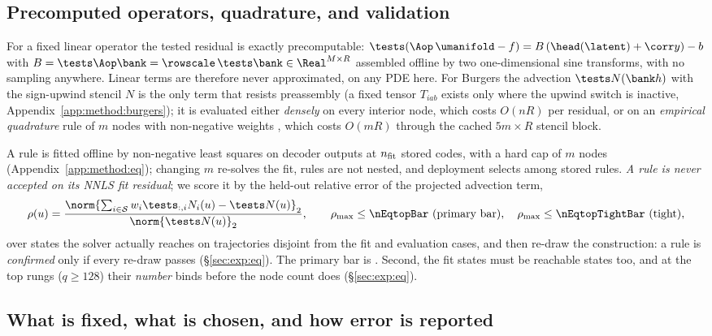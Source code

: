 \subsection{Precomputed operators, quadrature, and validation}
\label{sec:method:precomp}

For a fixed linear operator the tested residual is exactly precomputable:
$\tests(\Aop\,\umanifold-f)=B\,(\head(\latent)+\corr y)-b$ with
$B=\tests\Aop\bank=\rowscale\,\tests\bank\in\Real^{M\times R}$ assembled offline
by two one-dimensional sine transforms, with no sampling anywhere. Linear terms
are therefore never approximated, on any PDE here. For Burgers the advection
$\tests N(\bank h)$ with the sign-upwind stencil $N$ is the only term that
resists preassembly (a fixed tensor $T_{iab}$ exists only where the upwind
switch is inactive, Appendix~\ref{app:method:burgers}); it is evaluated either
\emph{densely} on every interior node, which costs $O(nR)$ per residual, or on
an \emph{empirical quadrature} rule of $m$ nodes with non-negative weights
\citep{Hernandez2017EQ,YanoPatera2019LPEQ}, which costs $O(mR)$ through the
cached $5m\times R$ stencil block.

A rule is fitted offline by non-negative least squares
\citep{LawsonHanson1974NNLS} on decoder outputs at $n_{\rm fit}$ stored codes,
with a hard cap of $m$ nodes (Appendix~\ref{app:method:eq}); changing $m$
re-solves the fit, rules are not nested, and deployment selects among stored
rules. \emph{A rule is never accepted on its NNLS fit residual}; we score it by
the held-out relative error of the projected advection term,
\begin{equation}
  \rho(u)=\frac{\norm{\sum_{i\in\mathcal S}w_i\tests_{:,i}N_i(u)-\tests N(u)}_2}{\norm{\tests N(u)}_2},
  \qquad
  \rho_{\max}\le\nEqtopBar\ \text{(primary bar)},\quad \rho_{\max}\le\nEqtopTightBar\ \text{(tight)},
  \label{eq:rho}
\end{equation}
over states the solver actually reaches on trajectories disjoint from the fit
and evaluation cases, and then re-draw the construction: a rule is
\emph{confirmed} only if every re-draw passes (\S\ref{sec:exp:eq}). The
primary bar is \nEqtopBarOrigin. Second, the fit states must be reachable states too, and at the top rungs
($q\ge128$) their \emph{number} binds before the node count does
(\S\ref{sec:exp:eq}).

\subsection{What is fixed, what is chosen, and how error is reported}
\label{sec:method:tuning}

